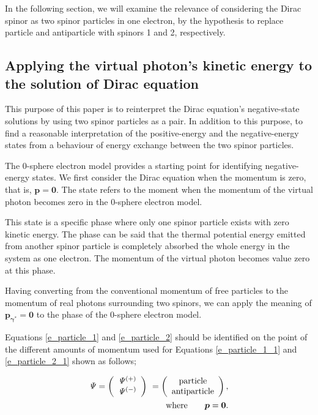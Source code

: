 \documentclass[%
 reprint,
 amsmath,amssymb,
 aps,
]{revtex4-1}
\numberwithin{equation}{section}%
\begin{document}
    In the following section, we will examine the relevance of considering the Dirac spinor as two spinor particles in one electron, by the hypothesis to replace particle and antiparticle with spinors 1 and 2, respectively.


\subsection{
    \label{sec:Applying the virtual photon's kinetic energy to the solution of Dirac equation}
        Applying the virtual photon's kinetic energy to the solution of Dirac equation}


    This purpose of this paper is to reinterpret the Dirac equation's negative-state solutions by using two spinor particles as a pair. In addition to this purpose, to find a reasonable interpretation of the positive-energy and the negative-energy states from a behaviour of energy exchange between the two spinor particles. 

    The 0-sphere electron model provides a starting point for identifying negative-energy states. We first consider the Dirac equation when the momentum is zero, that is, $ \bm{p} = \bm{0} $. The state refers to the moment when the momentum of the virtual photon becomes zero in the 0-sphere electron model.
    
    This state is a specific phase where only one spinor particle exists with zero kinetic energy. The phase can be said that the thermal potential energy emitted from another spinor particle is completely absorbed the whole energy in the system as one electron. The momentum of the virtual photon becomes value zero at this phase.
    
    Having converting from the conventional momentum of free particles to the momentum of real photons surrounding two spinors, we can apply the meaning of $ \bm{p_{\gamma^{*}}} = \bm{0} $ to the phase of the 0-sphere electron model.


    Equations \ref{e_particle_1} and \ref{e_particle_2} should be identified on the point of the different amounts of momentum used for Equations \ref{e_particle_1_1} and \ref{e_particle_2_1} shown as follows;

    
        \begin{align}
            \it\Psi =
                \left( 
                    \begin{array}{c}
                        \it\Psi^{(+)} \\ \it\Psi^{(-)}
                    \end{array}
                \right) \
            =
                \left(
                    \begin{array}{c}
                        \mathrm{particle} \\ \mathrm{antiparticle}
                    \end{array}
                \right)
                ,
            \notag
            \\
            \mathrm{where} \ \ \ \ \ \ \bm{p} = \bm{0}
            .
        \label{e_particle_1_1}
        \end{align}    
\end{document}
